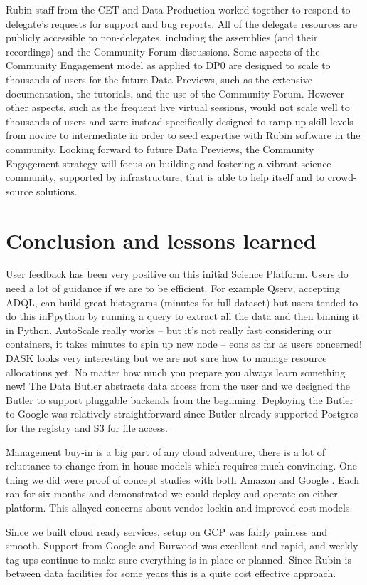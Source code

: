 Rubin staff from the CET and Data Production worked together to respond to delegate's requests for support and bug reports.
All of the delegate resources are publicly accessible to non-delegates, including the assemblies (and their recordings) and the Community Forum discussions.
Some aspects of the Community Engagement model as applied to DP0 are designed to scale to thousands of users for the future Data Previews, such as the extensive documentation, the tutorials, and the use of the Community Forum.
However other aspects, such as the frequent live virtual sessions, would not scale well to thousands of users and were instead specifically designed to ramp up skill levels from novice to intermediate in order to seed expertise with Rubin software in the community.
Looking forward to future Data Previews, the Community Engagement strategy will focus on building and fostering a vibrant science community,
supported by infrastructure, that is able to help itself and to crowd-source solutions.

\section{Conclusion and lessons learned}
User feedback has been very positive on this initial Science Platform.
Users do need a lot of guidance if we are to be efficient.
For example Qserv, accepting ADQL, can build great histograms (minutes for full dataset) but users
tended to do this inPpython by running a query to extract all the data and then binning it in Python.
AutoScale really works -- but it's not really fast considering our containers, it takes minutes to spin up new node -- eons as far as users concerned!
DASK looks very interesting but we are not sure how to manage resource allocations yet.
No matter how much you prepare you always learn something new!
The Data Butler abstracts data access from the user and we designed the Butler to support pluggable backends from the beginning.
Deploying the Butler to Google was relatively straightforward since Butler already supported Postgres for the registry and S3 for file access.

Management buy-in is a big part of any cloud adventure, there is a lot of reluctance to change from in-house models
which requires much convincing. One thing we did were proof of concept studies with both Amazon \citep{2020arXiv201106044B,DMTN-137} and Google \citep{DMTN-125}. Each ran for six months and demonstrated we could deploy and operate on either platform. This allayed concerns about vendor lockin and improved cost models.

Since we built cloud ready services, setup on GCP was fairly painless and smooth.
Support from Google and Burwood was excellent and rapid, and weekly tag-ups continue to make sure everything is in place or planned.
Since Rubin is between data facilities for some years this is a quite cost effective approach.
